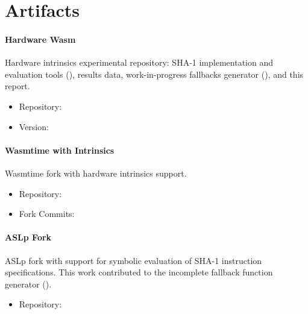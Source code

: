 \section{Artifacts}

\paragraph{Hardware Wasm}

Hardware intrinsics experimental repository:
SHA-1 implementation and evaluation tools (),
results data,
work-in-progress fallbacks generator (),
and this report.

\begin{itemize}
    \item Repository: 
    \item Version: \href{https://github.com/mmcloughlin/hwwasm/tree/\gitversion}{\code{\gitversion}}
\end{itemize}

\paragraph{Wasmtime with Intrinsics}

Wasmtime fork with hardware intrinsics support.

\begin{itemize}
    \item Repository: 
    \item Fork Commits: \href{https://github.com/mmcloughlin/hwwasmtime/compare/v27.0.0...hwwasm}{}
\end{itemize}

\paragraph{ASLp Fork}

ASLp fork with support for symbolic evaluation of SHA-1 instruction
specifications. This work contributed to the incomplete fallback function
generator ().

\begin{itemize}
    \item Repository: 
\end{itemize}

